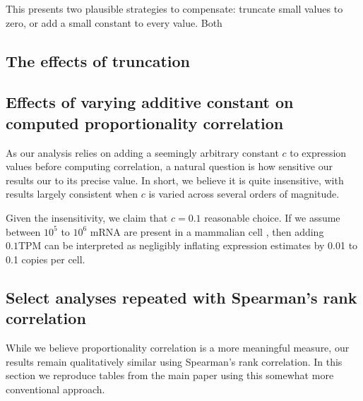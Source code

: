 \documentclass{article}
\begin{document}
This presents two plausible strategies to compensate: truncate small values to
zero, or add a small constant to every value. Both 


\subsection{The effects of truncation}



\subsection{Effects of varying additive constant on computed proportionality
            correlation}

As our analysis relies on adding a seemingly arbitrary constant $c$ to
expression values before computing correlation, a natural question is how
sensitive our results our to its precise value. In short, we believe it is quite
insensitive, with results largely consistent when $c$ is varied across several
orders of magnitude.


Given the insensitivity, we claim that $c = 0.1$ reasonable choice. If we assume
between $10^5$ to $10^6$ mRNA are present in a mammalian cell
\cite{Islam:2014is}, then adding $0.1 \text{TPM}$ can be interpreted as
negligibly inflating expression estimates by 0.01 to 0.1 copies per cell.

\subsection{Select analyses repeated with Spearman's rank correlation}

While we believe proportionality correlation is a more meaningful measure, our
results remain qualitatively similar using Spearman's rank correlation. In this
section we reproduce tables from the main paper using this somewhat more
conventional approach.
\end{document}

